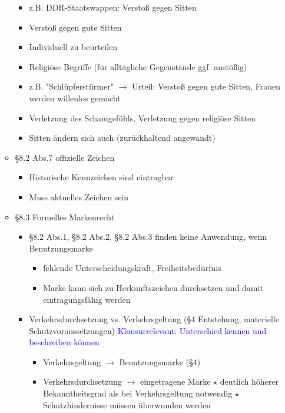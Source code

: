 \documentclass{report}
\begin{document}
\begin{itemize}
\begin{itemize}
\begin{itemize}
			\item z.B. DDR-Staatswappen: Verstoß gegen Sitten
			\item Verstoß gegen gute Sitten
			\item Individuell zu beurteilen
			\item Religiöse Begriffe (für alltägliche Gegenstände ggf. anstößig)
			\item z.B. "Schlüpferstürmer" $\rightarrow$ Urteil: Verstoß gegen gute Sitten, Frauen werden willenlos gemacht
			\item Verletzung des Schamgefühls, Verletzung gegen religiöse Sitten
			\item Sitten ändern sich auch (zurückhaltend angewandt)
		\end{itemize}
		\item §8.2 Abs.7 offizielle Zeichen
		\begin{itemize}
			\item Historische Kennzeichen sind eintragbar
			\item Muss aktuelles Zeichen sein
		\end{itemize}
		\item §8.3 Formelles Markenrecht
		\begin{itemize}
			\item §8.2 Abs.1, §8.2 Abs.2, §8.2 Abs.3 finden keine Anwendung, wenn Benutzungsmarke
			\begin{itemize}
				\item fehlende Unterscheidungskraft, Freiheitsbedürfnis
				\item Marke kann sich zu Herkunftszeichen durchsetzen und damit eintragungsfähig werden
			\end{itemize}
			\item Verkehrsdurchsetzung vs. Verkehrsgeltung (§4 Entstehung, materielle Schutzvoraussetzungen)
			\newline \textcolor{blue}{Klausurrelevant: Unterschied kennen und beschreiben können}
			\begin{itemize}
				\item Verkehrsgeltung $\rightarrow$ Benutzungsmarke (§4)
				\item Verkehrsdurchsetzung $\rightarrow$ eingetragene Marke
				\newline $\star$ deutlich höherer Bekanntheitsgrad als bei Verkehrsgeltung notwendig
				\newline $\star$ Schutzhindernisse müssen überwunden werden
			\end{itemize}
		\end{itemize}

\end{itemize}
\end{itemize}
\end{document}
